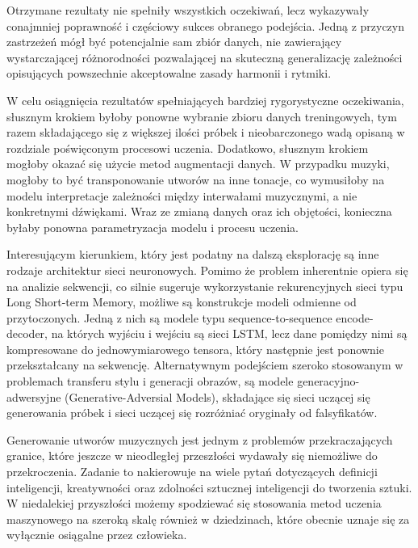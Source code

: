 {    Otrzymane rezultaty nie spełniły wszystkich oczekiwań, lecz wykazywały conajmniej poprawność i częściowy
    sukces obranego podejścia. Jedną z przyczyn zastrzeżeń mógł być potencjalnie sam zbiór danych, nie 
    zawierający wystarczającej różnorodności pozwalającej na skuteczną generalizację zależności opisujących 
    powszechnie akceptowalne zasady harmonii i rytmiki.

    W celu osiągnięcia rezultatów spełniających bardziej rygorystyczne oczekiwania, słusznym krokiem byłoby
    ponowne wybranie zbioru danych treningowych, tym razem składającego się z większej ilości próbek i nieobarczonego
    wadą opisaną w rozdziale poświęconym procesowi uczenia. 
    Dodatkowo, słusznym krokiem mogłoby okazać się użycie metod augmentacji danych. W przypadku muzyki, mogłoby to
    być transponowanie utworów na inne tonacje, co wymusiłoby na modelu interpretacje zależności między interwałami
    muzycznymi, a nie konkretnymi dźwiękami.
    Wraz ze zmianą danych oraz ich objętości, konieczna byłaby ponowna parametryzacja modelu i procesu uczenia.

    \bigskip

    Interesującym kierunkiem, który jest podatny na dalszą eksplorację są inne rodzaje architektur sieci neuronowych.
    Pomimo że problem inherentnie opiera się na analizie sekwencji, co silnie sugeruje wykorzystanie rekurencyjnych 
    sieci typu Long Short-term Memory, możliwe są konstrukcje modeli odmienne od przytoczonych. Jedną z nich są modele typu 
    sequence-to-sequence encode-decoder, na których wyjściu i wejściu są sieci LSTM, lecz dane pomiędzy nimi są
    kompresowane do jednowymiarowego tensora, który następnie jest ponownie przekształcany na sekwencję. 
    Alternatywnym podejściem szeroko stosowanym w problemach transferu stylu i generacji obrazów, 
    są modele generacyjno-adwersyjne (Generative-Adversial Models), składające się sieci uczącej się generowania 
    próbek i sieci uczącej się rozróżniać oryginały od falsyfikatów.

    \bigskip

    Generowanie utworów muzycznych jest jednym z problemów przekraczających granice, które
    jeszcze w nieodległej przeszłości wydawały się niemożliwe do przekroczenia. Zadanie to nakierowuje na wiele pytań 
    dotyczących definicji inteligencji, kreatywności oraz zdolności sztucznej inteligencji do tworzenia sztuki. 
    W niedalekiej przyszłości możemy spodziewać się stosowania metod uczenia maszynowego na szeroką skalę również w dziedzinach,
    które obecnie uznaje się za wyłącznie osiągalne przez człowieka. 

}
